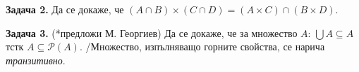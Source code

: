 \documentclass[10pt, a4paper]{article}
\theoremstyle{definition}
\newtheorem{problem}{Задача}
\theoremstyle{remark}
\newtheorem*{sol}{Решение}
\begin{document}
\begin{flushleft}
    \textbf{Задача 2.} Да се докаже, че $(A\cap B)\times(C\cap D)=(A\times C)\cap(B\times D)$.\\
\end{flushleft}


\begin{flushleft}
    \textbf{Задача 3.} (*предложи М. Георгиев) Да се докаже, че за множество $A$: $\bigcup A\subseteq A$ тстк $A\subseteq\mathcal{P}(A)$.
    /Множество, изпълняващо горните свойства, се нарича \emph{транзитивно}.\\
\end{flushleft}
\end{document}
